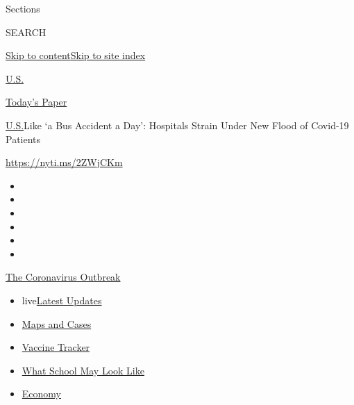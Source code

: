 Sections

SEARCH

\protect\hyperlink{site-content}{Skip to
content}\protect\hyperlink{site-index}{Skip to site index}

\href{https://www.nytimes.com/section/us}{U.S.}

\href{https://myaccount.nytimes.com/auth/login?response_type=cookie\&client_id=vi}{}

\href{https://www.nytimes.com/section/todayspaper}{Today's Paper}

\href{/section/us}{U.S.}\textbar{}Like `a Bus Accident a Day': Hospitals
Strain Under New Flood of Covid-19 Patients

\url{https://nyti.ms/2ZWjCKm}

\begin{itemize}
\item
\item
\item
\item
\item
\item
\end{itemize}

\href{https://www.nytimes.com/news-event/coronavirus?action=click\&pgtype=Article\&state=default\&region=TOP_BANNER\&context=storylines_menu}{The
Coronavirus Outbreak}

\begin{itemize}
\tightlist
\item
  live\href{https://www.nytimes.com/2020/08/01/world/coronavirus-covid-19.html?action=click\&pgtype=Article\&state=default\&region=TOP_BANNER\&context=storylines_menu}{Latest
  Updates}
\item
  \href{https://www.nytimes.com/interactive/2020/us/coronavirus-us-cases.html?action=click\&pgtype=Article\&state=default\&region=TOP_BANNER\&context=storylines_menu}{Maps
  and Cases}
\item
  \href{https://www.nytimes.com/interactive/2020/science/coronavirus-vaccine-tracker.html?action=click\&pgtype=Article\&state=default\&region=TOP_BANNER\&context=storylines_menu}{Vaccine
  Tracker}
\item
  \href{https://www.nytimes.com/interactive/2020/07/29/us/schools-reopening-coronavirus.html?action=click\&pgtype=Article\&state=default\&region=TOP_BANNER\&context=storylines_menu}{What
  School May Look Like}
\item
  \href{https://www.nytimes.com/live/2020/07/31/business/stock-market-today-coronavirus?action=click\&pgtype=Article\&state=default\&region=TOP_BANNER\&context=storylines_menu}{Economy}
\end{itemize}

